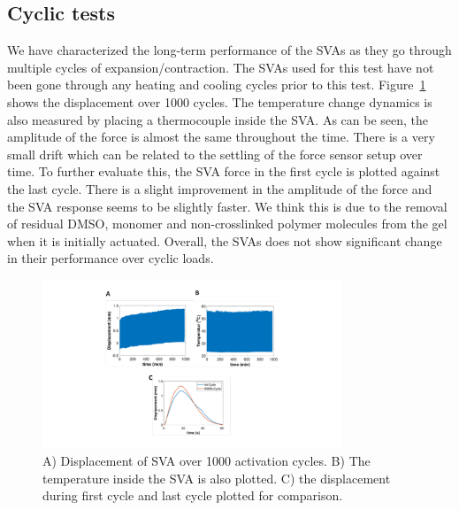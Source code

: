 \subsection{Cyclic tests}
We have characterized the long-term performance of the SVAs as they go through multiple cycles of expansion/contraction. The SVAs used for this test have not been gone through any heating and cooling cycles prior to this test. Figure~\ref{fig:cyclicDisp} shows the displacement over 1000 cycles. The temperature change dynamics is also measured by placing a thermocouple inside the SVA. As can be seen, the amplitude of the force is almost the same throughout the time. There is a very small drift which can be related to the settling of the force sensor setup over time. To further evaluate this, the SVA force in the first cycle is plotted against the last cycle. There is a slight improvement in the amplitude of the force and the SVA response seems to be slightly faster. We think this is due to the removal of residual DMSO, monomer and non-crosslinked polymer molecules from the gel when it is initially actuated. Overall, the SVAs does not show significant change in their performance over cyclic loads. 
\begin{figure}[!htb]
      \centering
      \includegraphics[width=0.8\textwidth]{cyclicDisp.pdf}
      \caption{A) Displacement of SVA over 1000 activation cycles. B) The temperature inside the SVA is also plotted. C) the displacement during first cycle and last cycle plotted for comparison.}
      \label{fig:cyclicDisp}
\end{figure}

